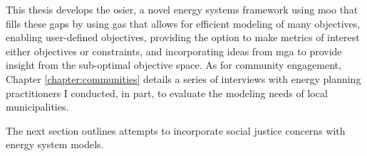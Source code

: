 This thesis develops the \acf{osier}, a novel energy systems framework using
\ac{moo} that fills these gaps by using \acp{ga} that allows for efficient
modeling of many objectives, enabling user-defined objectives, providing the
option to make metrics of interest either objectives or constraints, and
incorporating ideas from \ac{mga} to provide insight from the sub-optimal
objective space. As for community engagement, Chapter \ref{chapter:communities}
details a series of interviews with energy planning practitioners I conducted,
in part, to evaluate the modeling needs of local municipalities.



The next section outlines attempts to incorporate social justice concerns with
energy system models.







